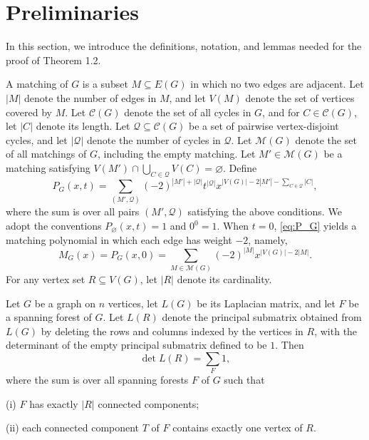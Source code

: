 \documentclass[11pt, a4paper]{article}
\begin{document}
\section{Preliminaries}

In this section, we introduce the definitions, notation, and lemmas needed for the proof of Theorem 1.2.

A matching of $G$ is a subset $M \subseteq E(G)$ in which no two edges are adjacent.
Let $|M|$ denote the number of edges in $M$, and let $V(M)$ denote the set of vertices covered by $M$.
Let $\mathcal{C}(G)$ denote the set of all cycles in $G$, and for $C \in \mathcal{C}(G)$, let $|C|$ denote its length.
Let $\mathcal{Q} \subseteq \mathcal{C}(G)$ be a set of pairwise vertex-disjoint cycles, and let $|\mathcal{Q}|$ denote the number of cycles in $\mathcal{Q}$.
Let $\mathcal{M}(G)$ denote the set of all matchings of $G$, including the empty matching.
Let $M' \in \mathcal{M}(G)$ be a matching satisfying $V(M') \cap \bigcup_{C \in \mathcal{Q}} V(C) = \varnothing$.
Define
\begin{equation}\label{eq:P_G}
P_G(x,t) = \sum_{(M',\mathcal{Q})} (-2)^{|M'|+|\mathcal{Q}|} t^{|\mathcal{Q}|} x^{|V(G)|-2|M'|-\sum_{C\in\mathcal{Q}}|C|},
\end{equation}
where the sum is over all pairs $(M',\mathcal{Q})$ satisfying the above conditions.
We adopt the conventions $P_{\varnothing}(x,t)=1$ and $0^0=1$.
When $t=0$, \eqref{eq:P_G} yields a matching polynomial in which each edge has weight $-2$, namely,
\[
M_G(x) = P_G(x,0) = \sum_{M \in \mathcal{M}(G)} (-2)^{|M|} x^{|V(G)|-2|M|}.
\]
For any vertex set $R \subseteq V(G)$, let $|R|$ denote its cardinality.
\begin{lemma}\label{lem:10}
Let $G$ be a graph on $n$ vertices, let $L(G)$ be its Laplacian matrix, and let $F$ be a spanning forest of $G$.
Let $L(R)$ denote the principal submatrix obtained from $L(G)$ by deleting the rows and columns indexed by the vertices in $R$, with the determinant of the empty principal submatrix defined to be $1$.
Then
\[
\det L(R) = \sum_{F} 1,
\]
where the sum is over all spanning forests $F$ of $G$ such that

\textup{(i)} $F$ has exactly $|R|$ connected components;

\textup{(ii)} each connected component $T$ of $F$ contains exactly one vertex of $R$.
\end{lemma}
\end{document}
